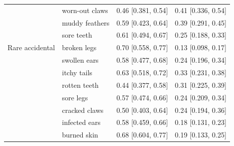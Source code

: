 \documentclass[10pt,letterpaper]{article}
\begin{document}
\begin{table}[h]
\begin{tabular}{| l || l | l | l |}
      & worn-out claws     & 0.46 {[}0.381, 0.54{]} & 0.41 {[}0.336, 0.54{]} \\
      & muddy feathers     & 0.59 {[}0.423, 0.64{]} & 0.39 {[}0.291, 0.45{]} \\
      & sore teeth         & 0.61 {[}0.494, 0.67{]} & 0.25 {[}0.188, 0.33{]} \\
Rare accidental & broken legs        & 0.70 {[}0.558, 0.77{]} & 0.13 {[}0.098, 0.17{]} \\
       & swollen ears       & 0.58 {[}0.477, 0.68{]} & 0.24 {[}0.196, 0.34{]} \\
       & itchy tails        & 0.63 {[}0.518, 0.72{]} & 0.33 {[}0.231, 0.38{]} \\
       & rotten teeth       & 0.44 {[}0.377, 0.58{]} & 0.31 {[}0.225, 0.39{]} \\
       & sore legs          & 0.57 {[}0.474, 0.66{]} & 0.24 {[}0.209, 0.34{]} \\
       & cracked claws      & 0.50 {[}0.403, 0.64{]} & 0.24 {[}0.194, 0.36{]} \\
       & infected ears      & 0.58 {[}0.459, 0.66{]} & 0.18 {[}0.131, 0.23{]} \\
       & burned skin        & 0.68 {[}0.604, 0.77{]} & 0.19 {[}0.133, 0.25{]} \\
       \hline
\end{tabular}
\end{table}    
    
\end{document}
